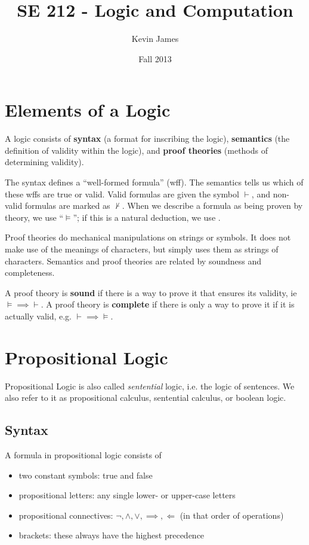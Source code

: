 \documentclass[12pt]{article}
\newcommand{\implied}{\Longleftarrow}
\begin{document}
\title{SE 212 - Logic and Computation}
\author{Kevin James}
\date{\vspace{-2ex}Fall 2013}
\maketitle\HRule

\section*{Elements of a Logic}
A logic consists of {\bf syntax} (a format for inscribing the logic), {\bf semantics} (the definition of validity within the logic), and {\bf proof theories} (methods of determining validity).

The syntax defines a ``well-formed formula'' (wff). The semantics tells us which of these wffs are true or valid. Valid formulas are given the symbol $\vdash$, and non-valid formulas are marked as $\not\vdash$. When we describe a formula as being proven by theory, we use ``$\vDash$''; if this is a natural deduction, we use \vDashnd.

Proof theories do mechanical manipulations on strings or symbols. It does not make use of the meanings of characters, but simply uses them as strings of characters. Semantics and proof theories are related by soundness and completeness.

A proof theory is {\bf sound} if there is a way to prove it that ensures its validity, ie $\vDash\implies\vdash$. A proof theory is {\bf complete} if there is only a way to prove it if it is actually valid, e.g. $\vdash\implies\vDash$.

\section*{Propositional Logic}
Propositional Logic is also called {\it sentential} logic, i.e. the logic of sentences. We also refer to it as propositional calculus, sentential calculus, or boolean logic.

\subsection*{Syntax}
A formula in propositional logic consists of
\begin{itemize}
\item two constant symbols: true and false
\item propositional letters: any single lower- or upper-case letters
\item propositional connectives: $\neg, \land, \lor, \implies, \implied$ (in that order of operations)
\item brackets: these always have the highest precedence
\end{itemize}
\end{document}
